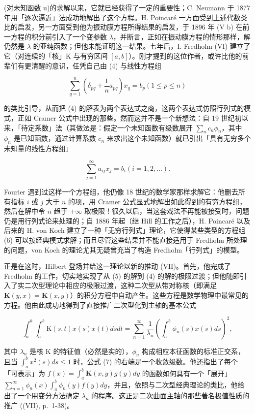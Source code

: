 (对未知函数 u)的求解以来，它就已经获得了一定的重要性；C. Neumann 于 1877 年用「逐次逼近」法成功地解出了这个方程。H. Poincaré 一方面受到上述代数类比的启发，另一方面受到他为振动膜方程所得结果的启发，于 1896 年 (V b) 在前一方程的积分前引入了一个变参数 \(\lambda\)，并断言，正如在振动膜方程的情形那样，解仍然是 \(\lambda\) 的亚纯函数；但他未能证明这一结果。七年后，I. Fredholm (VI) 建立了它（对连续的「核」K 与有穷区间 \([a, b]\)）。刚才提到的这位作者，或许比他的前辈们有更清醒的意识，任凭自己由 (4) 与线性方程组

\[
\sum_ {q = 1} ^ {n} \left(\delta_ {p q} + \frac {1}{n} a _ {p q}\right) x _ {q} = b _ {p} (1 \leqslant p \leqslant n)\tag{5}
\]

的类比引导，从而把 (4) 的解表为两个表达式之商，这两个表达式仿照行列式的模式，正如 Cramer 公式中出现的那些。然而这并不是一个新想法：自 19 世纪初以来，「待定系数」法（其做法是：假定一个未知函数有级数展开 \(\sum_{n} c_{n} \phi_{n}\)，其中 \(\phi_{n}\) 是已知函数，通过计算系数 \(c_{n}\) 来求出这个未知函数）就已引出「具有无穷多个未知量的线性方程组」

\[
\sum_ {j = 1} ^ {\infty} a _ {i j} x _ {j} = b _ {i} (i = 1, 2, \dots).\tag{6}
\]

Fourier 遇到过这样一个方程组，他仍像 18 世纪的数学家那样求解它：他删去所有指标 \(i\) 或 \(j\) 大于 \(n\) 的项，用 Cramer 公式显式地解出如此得到的有穷方程组，然后在解中令 \(n\) 趋于 \(+\infty\) 取极限！很久以后，当这套戏法不再能被接受时，问题仍是用行列式论来处理的；自 1886 年起（继 Hill 的工作之后），H. Poincaré 以及后来的 H. von Koch 建立了一种「无穷行列式」理论，它使得某些类型的方程组 (6) 可以按经典模式求解；而且尽管这些结果并不能直接适用于 Fredholm 所处理的问题，von Koch 的理论尤其无疑曾充当了构造 Fredholm「行列式」的模型。

正是在这时，Hilbert 登场并给这一理论以新的推动 (VII)。首先，他完成了 Fredholm 的工作，切实地实现了从 (5) 的解到 (4) 的解的极限过渡；但他随即引入了实二次型理论中相应的极限过渡，这种二次型从带对称核（即满足 \(\mathbf{K}(y,x)=\mathbf{K}(x,y)\)）的积分方程中自动产生。这些方程是数学物理中最常见的方程。他由此成功地得到了直接推广二次型化到主轴的基本公式

\[
\int_ {a} ^ {b} \int_ {a} ^ {b} \mathrm{K} (s, t) x (s) x (t) d s d t = \sum_ {n = 1} ^ {\infty} \frac {1}{\lambda_ {n}} \left(\int_ {a} ^ {b} \phi_ {n} (s) x (s) d s\right) ^ {2},\tag{7}
\]

其中 \(\lambda_{n}\) 是核 K 的特征值（必然是实的），\(\phi_{n}\) 构成相应本征函数的标准正交系，且当 \(\int_{a}^{b} x^{2}(s) ds \leqslant 1\) 时，公式 (7) 的右端是一个收敛级数。他还指出了每个「可表示」为 \(f(x) = \int_{a}^{b} \mathbf{K}(x, y) g(y) dy\) 的函数如何具有一个「展开」 \(\sum_{n=1}^{\infty} \phi_{n}(x) \int_{a}^{b} \phi_{n}(y) f(y) dy\)，并且，依照与二次型经典理论的类比，他给出了一个用变分方法确定 \(\lambda_{n}\) 的程序。这正是二次曲面主轴的那些著名极值性质的推广 ((VII), p.~1-38)。

